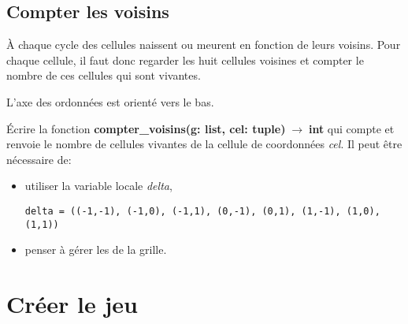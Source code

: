\documentclass[a4paper,11pt]{article}
\begin{document}
\begin{Form}
\subsection{Compter les voisins}
À chaque cycle des cellules naissent ou meurent en fonction de leurs voisins. Pour chaque cellule, il faut donc regarder les huit cellules voisines et compter le nombre de ces cellules qui sont vivantes.
\begin{center}
L'axe des ordonnées est orienté vers le bas.
\label{coord}
\end{center}
\begin{activite}
Écrire la fonction \textbf{compter\_voisins(g: list, cel: tuple)$\;\rightarrow\;$int} qui compte et renvoie le nombre de cellules vivantes de la cellule de coordonnées \emph{cel}. Il peut être nécessaire de:
\begin{itemize}
\item utiliser la variable locale \emph{delta},
\begin{lstlisting}[xleftmargin=1.3em,xrightmargin=1.3em]
delta = ((-1,-1), (-1,0), (-1,1), (0,-1), (0,1), (1,-1), (1,0), (1,1))
\end{lstlisting}
\item penser à gérer les  de la grille.
\end{itemize} 
\end{activite}
\section{Créer le jeu}

\end{Form}
\end{document}
